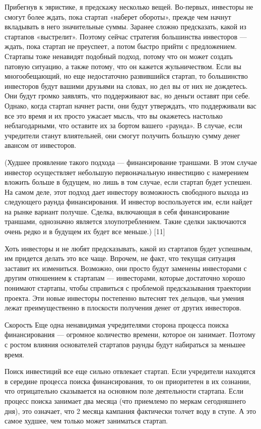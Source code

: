 \documentclass[ebook,12pt,oneside,openany]{memoir}
\begin{document}
Прибегнув к эвристике, я предскажу несколько вещей. Во-первых,
инвесторы не смогут более ждать, пока стартап «наберет обороты»,
прежде чем начнут вкладывать в него значительные суммы. Заранее сложно
предсказать, какой из стартапов «выстрелит». Поэтому сейчас стратегия
большинства инвесторов — ждать, пока стартап не преуспеет, а потом
быстро прийти с предложением. Стартапы тоже ненавидят подобный подход,
потому что он может создать патовую ситуацию, а также потому, что он
кажется жульничеством. Если вы многообещающий, но еще недостаточно
развившийся стартап, то большинство инвесторов будут вашими друзьями
на словах, но дел вы от них не дождетесь. Они будут громко заявлять,
что поддерживают вас, но деньги оставят при себе. Однако, когда
стартап начнет расти, они будут утверждать, что поддерживали вас все
это время и их просто ужасает мысль, что вы окажетесь настолько
неблагодарными, что оставите их за бортом вашего «раунда». В случае,
если учредители станут влиятельней, они смогут получить большую сумму
денег авансом от инвесторов.

(Худшее проявление такого подхода — финансирование траншами. В этом
случае инвестор осуществляет небольшую первоначальную инвестицию с
намерением вложить больше в будущем, но лишь в том случае, если
стартап будет успешен. На самом деле, этот подход дает инвестору
возможность свободного выхода из следующего раунда финансирования. И
инвестор воспользуется им, если найдет на рынке вариант получше.
Сделка, включающая в себя финансирование траншами, однозначно является
злоупотреблением. Такие сделки заключаются очень редко и в будущем их
будет все меньше.) [11]

Хоть инвесторы и не любят предсказывать, какой из стартапов будет
успешным, им придется делать это все чаще. Впрочем, не факт, что
текущая ситуация заставит их измениться. Возможно, они просто будут
заменены инвесторами с другим отношением к стартапам — инвесторами,
которые достаточно хорошо понимают стартапы, чтобы справиться с
проблемой предсказывания траектории проекта. Эти новые инвесторы
постепенно вытеснят тех дельцов, чьи умения лежат преимущественно в
плоскости получения денег от других инвесторов.

Скорость Еще одна ненавидимая учредителями сторона процесса поиска
финансирования — огромное количество времени, которое он занимает.
Поэтому с ростом влияния основателей стартапов раунды будут набираться
за меньшее время.

Поиск инвестиций все еще сильно отвлекает стартап. Если учредители
находятся в середине процесса поиска финансирования, то он приоритетен
в их сознании, что отрицательно сказывается на основном поле
деятельности стартапа. Если процесс поиска занимает два месяца (что
приемлемо по меркам сегодняшнего дня), это означает, что 2 месяца
кампания фактически толчет воду в ступе. А это самое худшее, чем
только может заниматься стартап.
\end{document}
